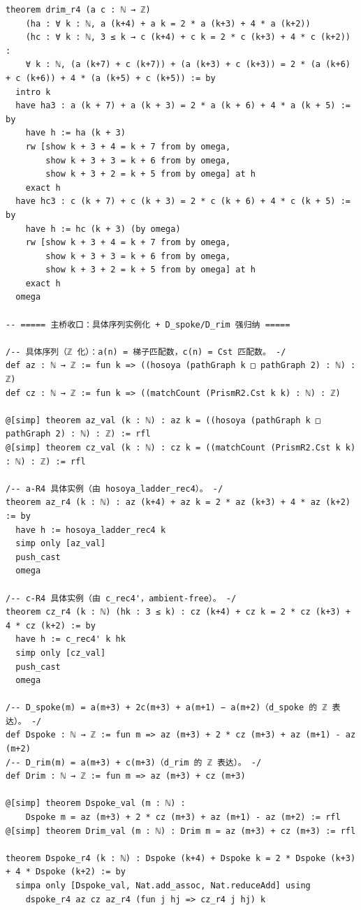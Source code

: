 \documentclass[11pt]{article}
\begin{document}
\begin{lstlisting}
theorem drim_r4 (a c : ℕ → ℤ)
    (ha : ∀ k : ℕ, a (k+4) + a k = 2 * a (k+3) + 4 * a (k+2))
    (hc : ∀ k : ℕ, 3 ≤ k → c (k+4) + c k = 2 * c (k+3) + 4 * c (k+2)) :
    ∀ k : ℕ, (a (k+7) + c (k+7)) + (a (k+3) + c (k+3)) = 2 * (a (k+6) + c (k+6)) + 4 * (a (k+5) + c (k+5)) := by
  intro k
  have ha3 : a (k + 7) + a (k + 3) = 2 * a (k + 6) + 4 * a (k + 5) := by
    have h := ha (k + 3)
    rw [show k + 3 + 4 = k + 7 from by omega,
        show k + 3 + 3 = k + 6 from by omega,
        show k + 3 + 2 = k + 5 from by omega] at h
    exact h
  have hc3 : c (k + 7) + c (k + 3) = 2 * c (k + 6) + 4 * c (k + 5) := by
    have h := hc (k + 3) (by omega)
    rw [show k + 3 + 4 = k + 7 from by omega,
        show k + 3 + 3 = k + 6 from by omega,
        show k + 3 + 2 = k + 5 from by omega] at h
    exact h
  omega

-- ===== 主桥收口：具体序列实例化 + D_spoke/D_rim 强归纳 =====

/-- 具体序列（ℤ 化）：a(n) = 梯子匹配数，c(n) = Cst 匹配数。 -/
def az : ℕ → ℤ := fun k => ((hosoya (pathGraph k □ pathGraph 2) : ℕ) : ℤ)
def cz : ℕ → ℤ := fun k => ((matchCount (PrismR2.Cst k k) : ℕ) : ℤ)

@[simp] theorem az_val (k : ℕ) : az k = ((hosoya (pathGraph k □ pathGraph 2) : ℕ) : ℤ) := rfl
@[simp] theorem cz_val (k : ℕ) : cz k = ((matchCount (PrismR2.Cst k k) : ℕ) : ℤ) := rfl

/-- a-R4 具体实例（由 hosoya_ladder_rec4）。 -/
theorem az_r4 (k : ℕ) : az (k+4) + az k = 2 * az (k+3) + 4 * az (k+2) := by
  have h := hosoya_ladder_rec4 k
  simp only [az_val]
  push_cast
  omega

/-- c-R4 具体实例（由 c_rec4'，ambient-free）。 -/
theorem cz_r4 (k : ℕ) (hk : 3 ≤ k) : cz (k+4) + cz k = 2 * cz (k+3) + 4 * cz (k+2) := by
  have h := c_rec4' k hk
  simp only [cz_val]
  push_cast
  omega

/-- D_spoke(m) = a(m+3) + 2c(m+3) + a(m+1) − a(m+2)（d_spoke 的 ℤ 表达）。 -/
def Dspoke : ℕ → ℤ := fun m => az (m+3) + 2 * cz (m+3) + az (m+1) - az (m+2)
/-- D_rim(m) = a(m+3) + c(m+3)（d_rim 的 ℤ 表达）。 -/
def Drim : ℕ → ℤ := fun m => az (m+3) + cz (m+3)

@[simp] theorem Dspoke_val (m : ℕ) :
    Dspoke m = az (m+3) + 2 * cz (m+3) + az (m+1) - az (m+2) := rfl
@[simp] theorem Drim_val (m : ℕ) : Drim m = az (m+3) + cz (m+3) := rfl

theorem Dspoke_r4 (k : ℕ) : Dspoke (k+4) + Dspoke k = 2 * Dspoke (k+3) + 4 * Dspoke (k+2) := by
  simpa only [Dspoke_val, Nat.add_assoc, Nat.reduceAdd] using
    dspoke_r4 az cz az_r4 (fun j hj => cz_r4 j hj) k


\end{lstlisting}
\end{document}
